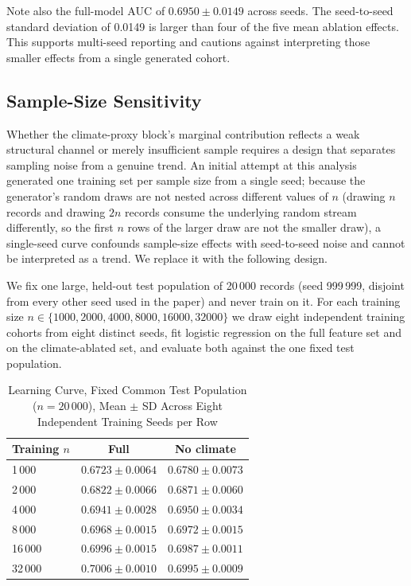 \documentclass[journal]{IEEEtran}
\newcommand{\auc}{\mbox{AUC}}
\begin{document}
Note also the full-model $\auc$ of $0.6950\pm0.0149$ across seeds. The seed-to-seed standard deviation of 0.0149 is larger than four of the five mean ablation effects. This supports multi-seed reporting and cautions against interpreting those smaller effects from a single generated cohort.

\subsection{Sample-Size Sensitivity}
Whether the climate-proxy block's marginal contribution reflects a weak structural channel or merely insufficient sample requires a design that separates sampling noise from a genuine trend. An initial attempt at this analysis generated one training set per sample size from a single seed; because the generator's random draws are not nested across different values of $n$ (drawing $n$ records and drawing $2n$ records consume the underlying random stream differently, so the first $n$ rows of the larger draw are not the smaller draw), a single-seed curve confounds sample-size effects with seed-to-seed noise and cannot be interpreted as a trend. We replace it with the following design.

We fix one large, held-out test population of 20\,000 records (seed 999\,999, disjoint from every other seed used in the paper) and never train on it. For each training size $n\in\{1000,2000,4000,8000,16000,32000\}$ we draw eight independent training cohorts from eight distinct seeds, fit logistic regression on the full feature set and on the climate-ablated set, and evaluate both against the one fixed test population.

\begin{table}[!t]
\caption{Learning Curve, Fixed Common Test Population ($n=20\,000$), Mean $\pm$ SD Across Eight Independent Training Seeds per Row}
\label{tab:learning}
\centering
\footnotesize
\begin{tabular}{@{}lcc@{}}
\toprule
Training $n$ & Full & No climate \\
\midrule
1\,000  & $0.6723\pm0.0064$ & $0.6780\pm0.0073$ \\
2\,000  & $0.6822\pm0.0066$ & $0.6871\pm0.0060$ \\
4\,000  & $0.6941\pm0.0028$ & $0.6950\pm0.0034$ \\
8\,000  & $0.6968\pm0.0015$ & $0.6972\pm0.0015$ \\
16\,000 & $0.6996\pm0.0015$ & $0.6987\pm0.0011$ \\
32\,000 & $0.7006\pm0.0010$ & $0.6995\pm0.0009$ \\
\bottomrule
\end{tabular}
\end{table}
\end{document}
